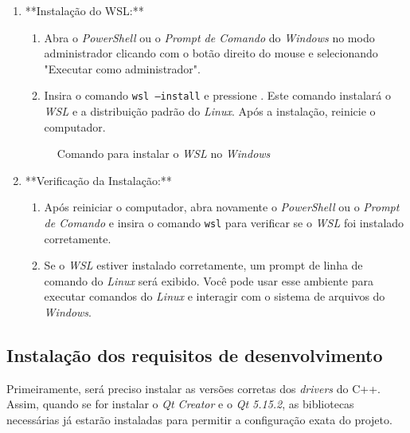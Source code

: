 \documentclass[a4paper,11pt]{article}
\newcommand{\qtcreator}{\textit{Qt Creator}}
\newcommand{\windows}{\textit{Windows}}
\newcommand{\linux}{\textit{Linux}}
\newcommand{\qtfive}{\textit{Qt 5.15.2}}
\begin{document}
\begin{enumerate}
	
	\item **Instalação do WSL:**
	\begin{enumerate}
		\item Abra o \textit{PowerShell} ou o \textit{Prompt de Comando} do \windows{} no modo administrador clicando com o botão direito do mouse e selecionando "Executar como administrador".
		\item Insira o comando \texttt{wsl --install} e pressione . Este comando instalará o \emph{WSL} e a distribuição padrão do \linux{}. Após a instalação, reinicie o computador.
	\end{enumerate}
	
	\begin{figure}[H]
		\centering
		\caption{Comando para instalar o \emph{WSL} no \windows{}}\label{fig:prompt_wsl}
	\end{figure}
	
	\item **Verificação da Instalação:**
	\begin{enumerate}
		\item Após reiniciar o computador, abra novamente o \textit{PowerShell} ou o \textit{Prompt de Comando} e insira o comando \texttt{wsl} para verificar se o \emph{WSL} foi instalado corretamente.
		\item Se o \emph{WSL} estiver instalado corretamente, um prompt de linha de comando do \linux{} será exibido. Você pode usar esse ambiente para executar comandos do \linux{} e interagir com o sistema de arquivos do \windows{}.
	\end{enumerate}
	
\end{enumerate}


\subsection{Instalação dos requisitos de desenvolvimento}

Primeiramente, será preciso instalar as versões corretas dos \textit{drivers} do C++. Assim, quando se for instalar o \qtcreator{} e o \qtfive{}, as bibliotecas necessárias já estarão instaladas para permitir a configuração exata do projeto.
\end{document}
